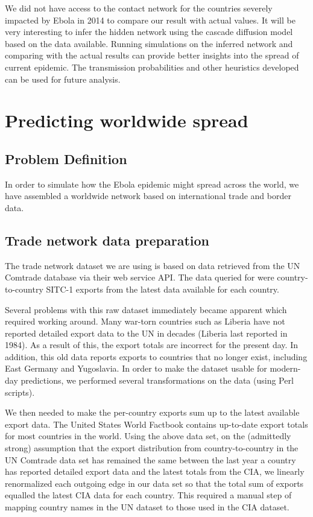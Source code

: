 \documentclass[10pt, journal,onecolumn]{IEEEtran}
\begin{document}
We did not have access to the  contact network for the countries  severely impacted by Ebola in 2014
to compare our result with actual values.  It will be  very interesting to infer the hidden network
using the cascade diffusion model based on the data available. Running simulations on  the inferred
network and comparing  with the actual results can provide better insights into the spread of
current epidemic. The transmission probabilities and other heuristics developed can be used for
future analysis.



\section{Predicting worldwide spread}
\label{sec:Worldwide}

\subsection{{Problem Definition}}

In order to simulate how the Ebola epidemic might spread across the world, we have assembled a
worldwide network based on international trade and border data.

\subsection{{Trade network data preparation}}
\label{SubSec:TradeData}

The trade network dataset we are using is based on data retrieved from the
UN Comtrade database \citep{uncomtradedata} via their web service API.
The data queried for were country-to-country SITC-1 exports from the latest data available
for each country.

Several problems with this raw dataset immediately became apparent which required working around.
Many war-torn countries such as Liberia have not reported detailed export data
to the UN in decades (Liberia last reported in 1984). As a result of this, the export totals
are incorrect for the present day. In addition, this old data reports exports to countries that
no longer exist, including East Germany and Yugoslavia. In order to make the dataset usable for
modern-day predictions, we performed several transformations on the data (using Perl scripts).

We then needed to make the per-country exports sum up to the latest available export data.
The United States \citep{ciatotalexports} World Factbook contains up-to-date export totals
for most countries in the world. Using the above data set, on the (admittedly strong) assumption
that the export distribution
from country-to-country in the UN Comtrade data set has remained the same between the last year a
country has reported detailed export data and the latest totals from the CIA, we linearly renormalized
each outgoing edge in our data set so that the total sum of exports equalled the latest CIA data
for each country.
This required a manual step of mapping country names in the UN dataset to those used in
the CIA dataset.
\end{document}
